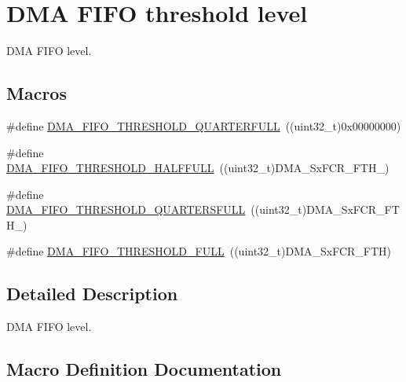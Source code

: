 \hypertarget{group___d_m_a___f_i_f_o__threshold__level}{}\section{D\+MA F\+I\+FO threshold level}
\label{group___d_m_a___f_i_f_o__threshold__level}


D\+MA F\+I\+FO level.  


\subsection*{Macros}
\begin{DoxyCompactItemize}
\item 
\#define \hyperlink{group___d_m_a___f_i_f_o__threshold__level_ga4debbd5733190b61b2115613d4b3658b}{D\+M\+A\+\_\+\+F\+I\+F\+O\+\_\+\+T\+H\+R\+E\+S\+H\+O\+L\+D\+\_\+Q\+U\+A\+R\+T\+E\+R\+F\+U\+LL}~((uint32\+\_\+t)0x00000000)
\item 
\#define \hyperlink{group___d_m_a___f_i_f_o__threshold__level_gad2b071aa3a3bfc936017f12fb956c56f}{D\+M\+A\+\_\+\+F\+I\+F\+O\+\_\+\+T\+H\+R\+E\+S\+H\+O\+L\+D\+\_\+\+H\+A\+L\+F\+F\+U\+LL}~((uint32\+\_\+t)D\+M\+A\+\_\+\+Sx\+F\+C\+R\+\_\+\+F\+T\+H\+\_)
\item 
\#define \hyperlink{group___d_m_a___f_i_f_o__threshold__level_gae1e4ba12bae8440421e6672795d71223}{D\+M\+A\+\_\+\+F\+I\+F\+O\+\_\+\+T\+H\+R\+E\+S\+H\+O\+L\+D\+\_\+Q\+U\+A\+R\+T\+E\+R\+S\+F\+U\+LL}~((uint32\+\_\+t)D\+M\+A\+\_\+\+Sx\+F\+C\+R\+\_\+\+F\+T\+H\+\_)
\item 
\#define \hyperlink{group___d_m_a___f_i_f_o__threshold__level_ga5de463bb24dc12fe7bbb300e1e4493f7}{D\+M\+A\+\_\+\+F\+I\+F\+O\+\_\+\+T\+H\+R\+E\+S\+H\+O\+L\+D\+\_\+\+F\+U\+LL}~((uint32\+\_\+t)D\+M\+A\+\_\+\+Sx\+F\+C\+R\+\_\+\+F\+TH)
\end{DoxyCompactItemize}


\subsection{Detailed Description}
D\+MA F\+I\+FO level. 



\subsection{Macro Definition Documentation}
